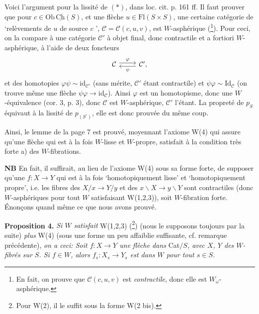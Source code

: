 \documentclass[11pt]{article}
\newcommand{\printedpage}[1]{\marginpar{\footnotesize p.~#1}}
\newcommand{\msp}[1]{\marginpar{\footnotesize [#1]}}
\newcommand{\Ch}{\underline{\mathrm{Ch}}}
\begin{document}
Voici l'argument pour la lissité de $(*)$, dans loc. cit. p. 161 ff. Il faut prouver que pour $c \in \mathrm{Ob}\,\Ch(S)$, et une flèche $u \in \mathrm{Fl}(S \times S)$, une certaine catégorie de ‘relèvements de $u$ de source $c$ ’, $\mathcal{C} = \mathcal{C}(c,u,v)$, est $W$-asphérique (\footnote[16]{En fait, on prouve que $\mathcal{C}(c,u,v)$ est \textit{contractile}, donc elle est $W_\omega$-asphérique.}). Pour ceci, on la compare à une catégorie $\mathcal{C}'$ à objet final, donc contractile et a fortiori $W$-asphérique, à l'aide de deux foncteurs
\[ \begin{tikzcd} \mathcal{C} \arrow[r, shift left, "\varphi"] & \mathcal{C}', \arrow[l, shift left, "\psi"] \end{tikzcd} \]
et des homotopies $\varphi\psi \sim \mathrm{id}_{\mathcal{C}'}$ (sans mérite, $\mathcal{C}'$ étant contractile)
\msp{page 10}
et $\psi\varphi \sim \mathrm{Id}_{\mathcal{C}}$ (on trouve même une flèche $\psi\varphi \longrightarrow \mathrm{id}_{\mathcal{C}}$). Ainsi $\varphi$ est un homotopisme, donc une $W$-équivalence (cor. 3, p. 3), donc $\mathcal{C}$ est $W$-asphérique, $\mathcal{C}'$ l'étant. La propreté de $p_S$ équivaut à la lissité de $p_{(S^\circ)}$, elle est donc prouvée du même coup.

\printedpage{9}

Ainsi, le lemme de la page 7 est prouvé, moyennant l'axiome W(4) qui assure qu'une flèche qui est à la fois $W$-lisse et $W$-propre, satisfait à la condition très forte a) des $W$-fibrations.

\textbf{NB} En fait, il suffirait, au lieu de l'axiome W(4) sous sa forme forte, de supposer qu'une $f : X \longrightarrow Y$ qui est à la fois `homotopiquement lisse' et `homotopiquement propre', i.e. les fibres des $X/x \longrightarrow Y/y$ et des $x\backslash X \longrightarrow y\backslash Y$ sont contractiles (donc $W$-asphériques pour tout $W$ satisfaisant W(1,2,3)), soit $W$-fibration forte. Énonçons quand même ce que nous avons prouvé.

\textbf{Proposition 4.} \textit{Si $W$ satisfait} W(1,2,3) (\footnote[17]{Pour W(2), il le suffit sous la forme W(2 bis).}) (nous le supposons toujours par la suite) \textit{plus} W(4) (sous une forme un peu affaiblie suffisante, cf. remarque précédente), \textit{on a ceci: Soit $f : X \longrightarrow Y$ une flèche dans} Cat$/S$\textit{, avec $X$, $Y$ des $W$-fibrés sur $S$. Si $f \in W$, alors $f_s : X_s \longrightarrow Y_s$ est dans $W$ pour tout $s \in S$.}
\end{document}
